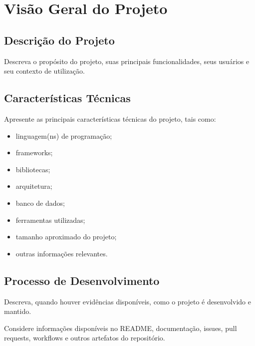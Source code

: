 \section{Visão Geral do Projeto}

\subsection{Descrição do Projeto}

Descreva o propósito do projeto, suas principais funcionalidades,
seus usuários e seu contexto de utilização.

\subsection{Características Técnicas}

Apresente as principais características técnicas do projeto,
tais como:

\begin{itemize}
    \item linguagem(ns) de programação;
    \item frameworks;
    \item bibliotecas;
    \item arquitetura;
    \item banco de dados;
    \item ferramentas utilizadas;
    \item tamanho aproximado do projeto;
    \item outras informações relevantes.
\end{itemize}

\subsection{Processo de Desenvolvimento}

Descreva, quando houver evidências disponíveis, como o projeto
é desenvolvido e mantido.

Considere informações disponíveis no README, documentação,
issues, pull requests, workflows e outros artefatos do repositório.
